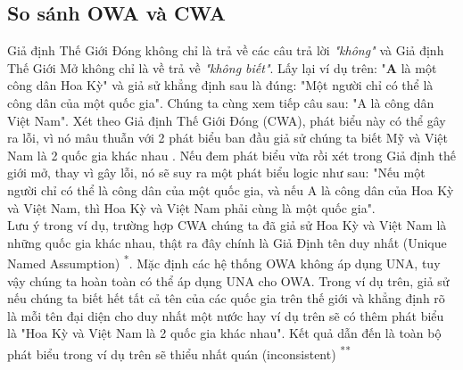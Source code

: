\subsection{So sánh OWA và CWA}
Giả định Thế Giới Đóng không chỉ là trả về các câu trả lời \textit{"không"} và Giả định Thế Giới Mở không chỉ là về trả về \textit{"không biết"}. Lấy lại ví dụ trên: "\textbf{A} là một công dân Hoa Kỳ" và giả sử khẳng định sau là đúng: "Một người chỉ có thể là công dân của một quốc gia". Chúng ta cùng xem tiếp câu sau: "A là công dân Việt Nam". Xét theo Giả định Thế Giới Đóng (CWA), phát biểu này có thể gây ra lỗi, vì nó mâu thuẫn với 2 phát biểu ban đầu giả sử chúng ta biết Mỹ và Việt Nam là 2 quốc gia khác nhau . Nếu đem phát biểu vừa rồi xét trong Giả định thế giới mở, thay vì gây lỗi, nó sẽ suy ra một phát biểu logic như sau: "Nếu một người chỉ có thể là công dân của một quốc gia, và nếu A là công dân của Hoa Kỳ và Việt Nam, thì Hoa Kỳ và Việt Nam phải cùng là một quốc gia".
{\let\thefootnote\relax{}
\let\thefootnote\relax{}
}
\\Lưu ý trong ví dụ, trường hợp CWA chúng ta đã giả sử Hoa Kỳ và Việt Nam là những quốc gia khác nhau, thật ra đây chính là Giả Định tên duy nhất (Unique Named Assumption) \textsuperscript{*}. Mặc định các hệ thống OWA không áp dụng UNA, tuy vậy chúng ta hoàn toàn có thể áp dụng UNA cho OWA. Trong ví dụ trên, giả sử nếu chúng ta biết hết tất cả tên của các quốc gia trên thế giới và khẳng định rõ là mỗi tên đại diện cho duy nhất một nước hay ví dụ trên sẽ có thêm phát biểu là "Hoa Kỳ và Việt Nam là 2 quốc gia khác nhau". Kết quả dẫn đến là toàn bộ phát biểu trong ví dụ trên sẽ thiểu nhất quán (inconsistent) \textsuperscript{**}
\clearpage
